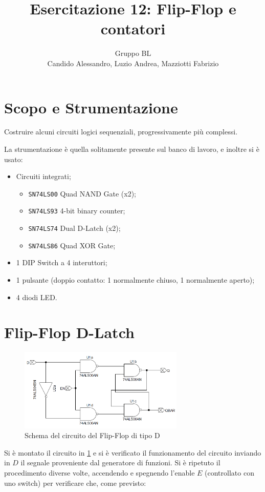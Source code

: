 \documentclass[a4paper,10pt]{article}
\title{Esercitazione 12: Flip-Flop e contatori}
\author{Gruppo BL \\ Candido Alessandro, Luzio Andrea, Mazziotti Fabrizio}
\def\code#1{\texttt{#1}}
\begin{document}
\maketitle

\section{Scopo e Strumentazione}
Costruire alcuni circuiti logici sequenziali, progressivamente
più complessi.

La strumentazione è quella solitamente presente sul banco di lavoro, e inoltre si è usato:
\begin{itemize}
	\item Circuiti integrati;
	\begin{itemize}
		\item \code{SN74LS00} Quad NAND Gate (x2);
		\item \code{SN74LS93} 4-bit binary counter;
		\item \code{SN74LS74} Dual D-Latch (x2);
		\item \code{SN74LS86} Quad XOR Gate;
	\end{itemize}
	\item 1 DIP Switch a 4 interuttori;
	\item 1 pulsante (doppio contatto: 1 normalmente chiuso, 1 normalmente aperto);
	\item 4 diodi LED.
\end{itemize}




\section{Flip-Flop D-Latch}

\begin{figure}[H]
	\centering
	\includegraphics[width=0.7\textwidth]{../grafici/FlipFlopD.png}
	\caption{Schema del circuito del Flip-Flop di tipo D}
	\label{fig:FFD}
\end{figure}
Si è montato il circuito in \cref{fig:FFD} e si è verificato il funzionamento del circuito inviando in $D$ il segnale proveniente dal generatore di funzioni. Si è ripetuto il procedimento diverse volte, accendendo e spegnendo l'enable $E$ (controllato con uno switch) per verificare che, come previsto:\\
\end{document}

